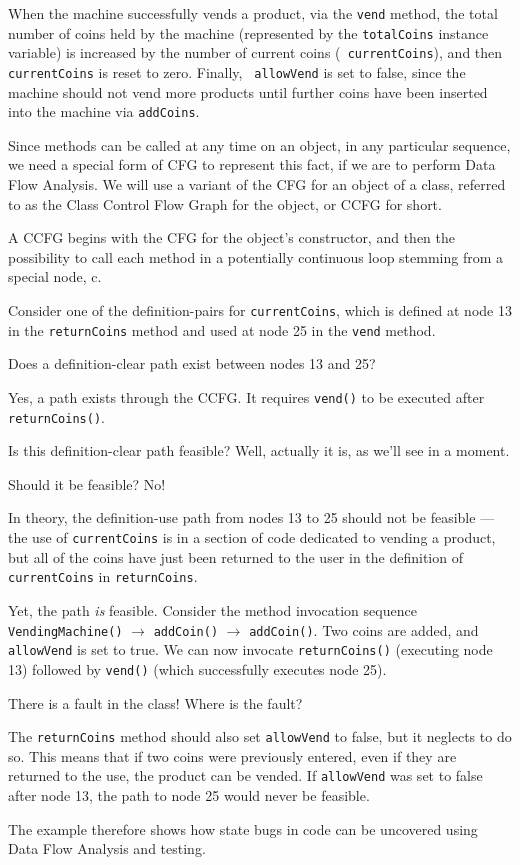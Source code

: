 When the machine successfully vends a product, via the {\tt vend} method, the
total number of coins held by the machine (represented by the {\tt totalCoins}
instance variable) is increased by the number of current coins ({\tt
currentCoins}), and then {\tt currentCoins} is reset to zero. Finally, {\tt
allowVend} is set to false, since the machine should not vend more products
until further coins have been inserted into the machine via {\tt addCoins}.

Since methods can be called at any time on an object, in any particular
sequence, we need a special form of CFG to represent this fact, if we are to
perform Data Flow Analysis. We will use a variant of the CFG for an object of a
class, referred to as the Class Control Flow Graph for the object, or CCFG for
short. 



A CCFG begins with the CFG for the object's constructor, and then the
possibility to call each method in a potentially continuous loop stemming from a
special node, c.

Consider one of the definition-pairs for {\tt currentCoins}, which is defined at
node 13 in the {\tt returnCoins} method and used at node 25 in the {\tt vend}
method.

Does a definition-clear path exist between nodes 13 and 25?


Yes, a path exists through the CCFG. It requires {\tt vend()} to be executed
after {\tt returnCoins()}. 

Is this definition-clear path feasible? Well, actually it is, as we'll see in a
moment. 

Should it be feasible? No!

In theory, the definition-use path from nodes 13 to 25 should not be feasible
--- the use of {\tt currentCoins} is in a section of code dedicated to vending a
product, but all of the coins have just been returned to the user in the
definition of {\tt currentCoins} in {\tt returnCoins}.

Yet, the path {\it is} feasible. Consider the method invocation sequence {\tt
VendingMachine()} $\rightarrow$ {\tt addCoin()} $\rightarrow$ {\tt addCoin()}.
Two coins are added, and {\tt allowVend} is set to true. We can now invocate
{\tt returnCoins()} (executing node 13) followed by {\tt vend()} (which
successfully executes node 25). 

There is a fault in the class! Where is the fault?

The {\tt returnCoins} method should also set {\tt allowVend} to false, but it
neglects to do so. This means that if two coins were previously entered, even if
they are returned to the use, the product can be vended. If {\tt allowVend} was
set to false after node 13, the path to node 25 would never be feasible.

The example therefore shows how state bugs in code can be uncovered using Data
Flow Analysis and testing. 

